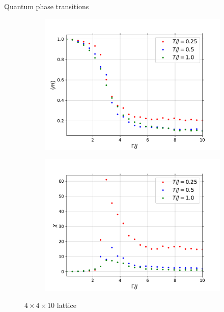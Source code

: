 \documentclass[aspectratio=169, xcolor=dvipsnames]{beamer}
\begin{document}
\begin{frame}{Quantum phase transitions}
	
	\begin{figure}[H]
		\centering
		\begin{subfigure}{0.45\textwidth}
			\centering
			\label{fig:gamma_m_T}
			\includegraphics[width=\textwidth]{Plots/gamma_transition_m_T.pdf}
		\end{subfigure}
		\begin{subfigure}{0.45\textwidth}
			\centering
			\label{fig:gamma_chi_T}
			\includegraphics[width=\textwidth]{Plots/gamma_transition_chi_T.pdf}
		\end{subfigure}
		\caption{$4\times4\times10$ lattice}
		\label{fig:gamma_transition_T}
	\end{figure}

\end{frame}
\end{document}

